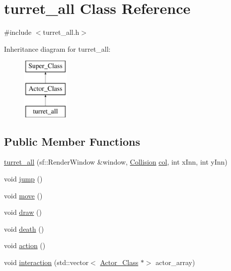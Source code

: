 \hypertarget{classturret__all}{}\section{turret\+\_\+all Class Reference}
\label{classturret__all}


{\ttfamily \#include $<$turret\+\_\+all.\+h$>$}

Inheritance diagram for turret\+\_\+all\+:\begin{figure}[H]
\begin{center}
\leavevmode
\includegraphics[height=3.000000cm]{classturret__all}
\end{center}
\end{figure}
\subsection*{Public Member Functions}
\begin{DoxyCompactItemize}
\item 
\hyperlink{classturret__all_a9d5e677783bb0f86ae51cf9f8a4f7990}{turret\+\_\+all} (sf\+::\+Render\+Window \&window, \hyperlink{class_collision}{Collision} \hyperlink{classturret__all_af94d8c16e0c4896dfc229e0f6dee32c2}{col}, int x\+Inn, int y\+Inn)
\item 
void \hyperlink{classturret__all_ac746cd08cbf83804b585d0df70aa9472}{jump} ()
\item 
void \hyperlink{classturret__all_a03416eb03334f4ee225c31cd18d25ba1}{move} ()
\item 
void \hyperlink{classturret__all_ab13a06bdbc2244a7a4460ffc8671f2bd}{draw} ()
\item 
void \hyperlink{classturret__all_ae43c3ac8bb96e81158de74944fe58010}{death} ()
\item 
void \hyperlink{classturret__all_a448418831d26b665611848751d6294b6}{action} ()
\item 
void \hyperlink{classturret__all_a6491dcec10ab94ccf35bb371d014e17f}{interaction} (std\+::vector$<$ \hyperlink{class_actor___class}{Actor\+\_\+\+Class} $\ast$$>$ actor\+\_\+array)
\end{DoxyCompactItemize}
